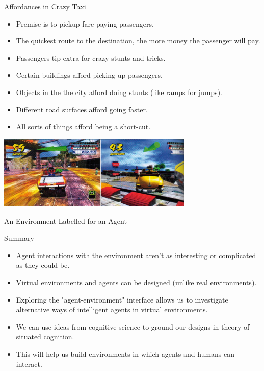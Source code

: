 \documentclass[aspectratio=1610,xcolor=dvipsnames,t]{beamer}
\begin{document}
\begin{frame}{Affordances in Crazy Taxi} 
    \begin{itemize}
        \item Premise is to pickup fare paying passengers.
        \item The quickest route to the destination, the more
              money the passenger will pay.
        \item Passengers tip extra for crazy stunts and tricks.
        \item Certain buildings afford picking up passengers.
        \item Objects in the the city afford doing stunts 
              (like ramps for jumps).
        \item Different road surfaces afford going faster.
        \item All sorts of things afford being a short-cut.
    \end{itemize}
    \begin{center}
        \includegraphics[width=0.7\textwidth]{crazytaxi} 
    \end{center}
\end{frame} 

\begin{frame}{An Environment Labelled for an Agent} 
\end{frame} 

\begin{frame}{Summary}
    \begin{itemize}
        \item Agent interactions with the environment aren't
              as interesting or complicated as they could be.
        \item Virtual environments and agents can be designed
              (unlike real environments).
        \item Exploring the "agent-environment" interface allows
              us to investigate alternative ways of intelligent
              agents in virtual environments.
        \item We can use ideas from cognitive science to  
              ground our designs in theory of situated cognition.
        \item This will help us build environments in which agents
              and humans can interact. 
    \end{itemize}
\end{frame} 
\end{document}
